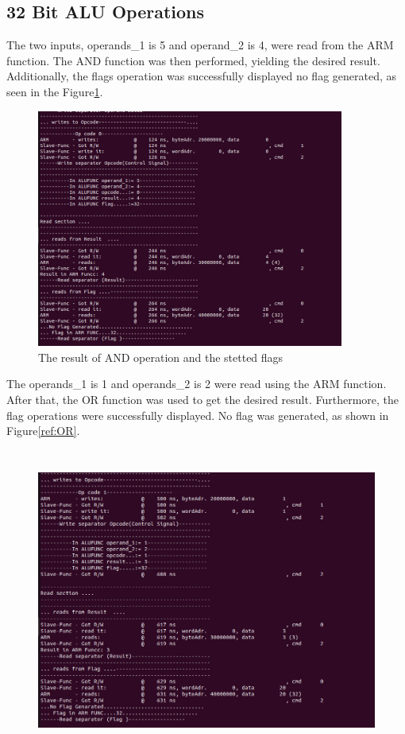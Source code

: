 \documentclass[a4paper,12pt,english]{report}
\begin{document}
\begin{enumerate}
\subsection{32 Bit ALU Operations}
The two inputs, operands\_1 is 5 and operand\_2 is 4, were read from the ARM function. The AND function was then performed, yielding the desired result. Additionally, the flags operation was successfully displayed  no flag generated, as seen in the Figure\ref{ref: AND}.\\
 \begin{figure}[ht]
	\centering
	\includegraphics[width=0.9\textwidth]{AND} %
	\caption{The result of AND operation and the stetted flags}
	\label{ref: AND}
\end{figure}
\newpage
The operands\_1 is 1 and operands\_2 is 2 were read using the ARM function. After that, the OR function was used to get the desired result. Furthermore, the flag operations were successfully displayed. No flag was generated, as shown in Figure\ref{ref:OR}.\\
 \begin{figure}[ht]
	\centering
\includegraphics[width=16cm, height=10cm]{OR} %

\end{figure}
\end{enumerate}
\end{document}
